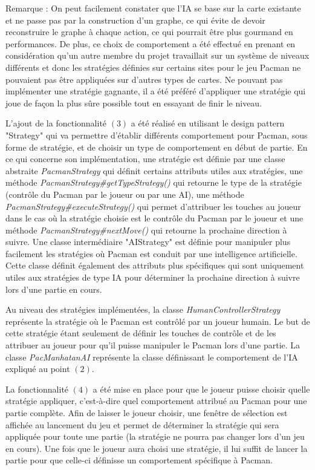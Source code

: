 \documentclass[12pt, openany]{report}
\begin{document}
Remarque : On peut facilement constater que l'IA se base sur la carte existante et ne passe pas par la construction d'un graphe, ce qui évite de devoir reconstruire le graphe à chaque action, ce qui pourrait être plus gourmand en performances. De plus, ce choix de comportement a été effectué en prenant en considération qu'un autre membre du projet travaillait sur un système de niveaux différents et donc les stratégies définies sur certains sites pour le jeu Pacman ne pouvaient pas être appliquées sur d'autres types de cartes. Ne pouvant pas implémenter une stratégie gagnante, il a été préféré d'appliquer une stratégie qui joue de façon la plus sûre possible tout en essayant de finir le niveau. 



L'ajout de la fonctionnalité $(3)$ a été réalisé en utilisant le design pattern "Strategy" qui va permettre d'établir différents comportement pour Pacman, sous forme de stratégie, et de choisir un type de comportement en début de partie. En ce qui concerne son implémentation, une stratégie est définie par une classe abstraite \mbox{\textit{PacmanStrategy}} qui définit certains attributs utiles aux stratégies, une méthode \mbox{\textit{PacmanStrategy\#getTypeStrategy()}} qui retourne le type de la stratégie (contrôle du Pacman par le joueur ou par une AI), une méthode \mbox{\textit{PacmanStrategy\#executeStrategy()}} qui permet d'attribuer les touches au joueur dans le cas où la stratégie choisie est le contrôle du Pacman par le joueur et une méthode \mbox{\textit{PacmanStrategy\#nextMove()}} qui retourne la prochaine direction à suivre. Une classe intermédiaire "AIStrategy" est définie pour manipuler plus facilement les stratégies où Pacman est conduit par une intelligence artificielle. Cette classe définit également des attributs plus spécifiques qui sont uniquement utiles aux stratégies de type IA pour déterminer la prochaine direction à suivre lors d'une partie en cours.

Au niveau des stratégies implémentées, la classe \mbox{\textit{HumanControllerStrategy}} représente la stratégie où le Pacman est contrôlé par un joueur humain. Le but de cette stratégie étant seulement de définir les touches de contrôle et de les attribuer au joueur pour qu'il puisse manipuler le Pacman lors d'une partie. La classe \mbox{\textit{PacManhatanAI}} représente la classe définissant le comportement de l'IA expliqué au point $(2)$.



La fonctionnalité $(4)$ a été mise en place pour que le joueur puisse choisir quelle stratégie appliquer, c'est-à-dire quel comportement attribué au Pacman pour une partie complète. Afin de laisser le joueur choisir, une fenêtre de sélection est affichée au lancement du jeu et permet de déterminer la stratégie qui sera appliquée pour toute une partie (la stratégie ne pourra pas changer lors d'un jeu en cours). Une fois que le joueur aura choisi une stratégie, il lui suffit de lancer la partie pour que celle-ci définisse un comportement spécifique à Pacman.
\end{document}
